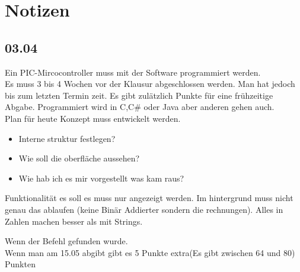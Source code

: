 \section{Notizen}

\subsection{03.04}
Ein PIC-Mircocontroller muss mit der Software programmiert werden. \\ 
Es muss 3 bis 4 Wochen vor der Klausur abgeschlossen werden. Man hat jedoch bis zum letzten Termin zeit. Es gibt zulätzlich Punkte für eine frühzeitige Abgabe.
Programmiert wird in C,C\# oder Java aber anderen gehen auch.\\

Plan für heute Konzept muss entwickelt werden.\\
\begin{itemize}
    \item Interne struktur festlegen?
    \item Wie soll die oberfläche aussehen?
    \item Wie hab ich es mir vorgestellt was kam raus?
\end{itemize}

Funktionalität es soll es muss nur angezeigt werden. Im hintergrund muss nicht genau das ablaufen (keine Binär Addierter sondern die rechnungen).
Alles in Zahlen machen besser als mit Strings.

Wenn der Befehl gefunden wurde.\\ 
Wenn man am 15.05 abgibt gibt es 5 Punkte extra(Es gibt zwischen 64 und 80) Punkten